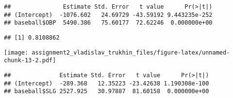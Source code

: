 \documentclass[
]{article}
\newenvironment{Shaded}{\begin{snugshade}}{\end{snugshade}}
\newcommand{\CommentTok}[1]{\textcolor[rgb]{0.56,0.35,0.01}{\textit{#1}}}
\newcommand{\FunctionTok}[1]{\textcolor[rgb]{0.00,0.00,0.00}{#1}}
\newcommand{\NormalTok}[1]{#1}
\newcommand{\OtherTok}[1]{\textcolor[rgb]{0.56,0.35,0.01}{#1}}
\newcommand{\SpecialCharTok}[1]{\textcolor[rgb]{0.00,0.00,0.00}{#1}}
\begin{document}
\begin{verbatim}
##               Estimate Std. Error   t value      Pr(>|t|)
## (Intercept)  -1076.602   24.69729 -43.59192 9.443235e-252
## baseball$OBP  5490.386   75.60177  72.62246  0.000000e+00
\end{verbatim}

\begin{Shaded}
\end{Shaded}

\begin{verbatim}
## [1] 0.8108862
\end{verbatim}

\begin{Shaded}
\end{Shaded}

\texttt{[image: assignment2\_vladislav\_trukhin\_files/figure-latex/unnamed-chunk-13-2.pdf]}

\begin{Shaded}
\end{Shaded}

\begin{verbatim}
##              Estimate Std. Error   t value      Pr(>|t|)
## (Intercept)  -289.368   12.35223 -23.42638 1.190308e-100
## baseball$SLG 2527.925   30.97887  81.60158  0.000000e+00
\end{verbatim}

\begin{Shaded}
\end{Shaded}
\end{document}
